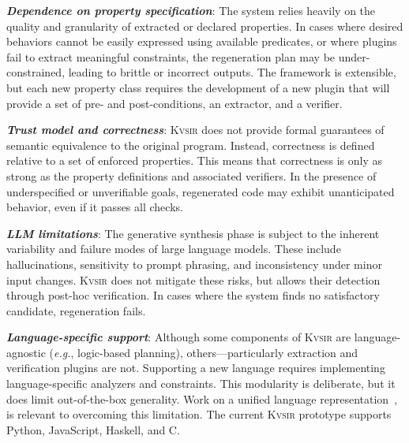 \documentclass[sigplan,review,anonymous,10pt]{acmart}
\def\eg{{\em e.g.}, }
\newcommand{\sys}{{\scshape Kv{\textalpha}sir}\xspace}
\newcommand{\heading}[1]{\vspace{2pt}\noindent\textbf{\emph{#1}}:\enspace}
\begin{document}
\heading{Dependence on property specification}
The system relies heavily on the quality and granularity of extracted or declared properties.
In cases where desired behaviors cannot be easily expressed using available
predicates, or where plugins fail to extract meaningful constraints, the
regeneration plan may be under-constrained, leading to brittle or incorrect
outputs. The framework is extensible, but each new property class requires the
development of a new plugin that will provide a set of pre- and
post-conditions, an extractor, and a verifier.

\heading{Trust model and correctness}
\sys
does not provide formal guarantees
of semantic equivalence
to the original program.
Instead,
correctness is defined relative to a set of enforced properties.
This means that correctness is only as strong as the property definitions and associated verifiers.
In the presence of underspecified or unverifiable goals,
regenerated code
may exhibit unanticipated behavior,
even if it passes all checks. 

\heading{LLM limitations}
The generative synthesis phase
is subject to the inherent variability and failure modes
of large language models.
These include hallucinations,
sensitivity to prompt phrasing,
and inconsistency
under minor input changes.
\sys does not mitigate these risks,
but allows their detection
through post-hoc verification.
In cases where the system finds no satisfactory candidate,
regeneration fails.

\heading{Language-specific support}
Although some components of \sys are language-agnostic (\eg logic-based planning),
others---particularly extraction and verification plugins are not.
Supporting a new language
requires implementing language-specific analyzers and constraints.
This modularity is deliberate,
but it does limit out-of-the-box generality.
Work on a unified language representation~\cite{koppel2018onetool,bap2011,dillig2009sail},
is relevant to overcoming this limitation.
The current \sys prototype
supports Python, JavaScript, Haskell, and C. 

\end{document}
